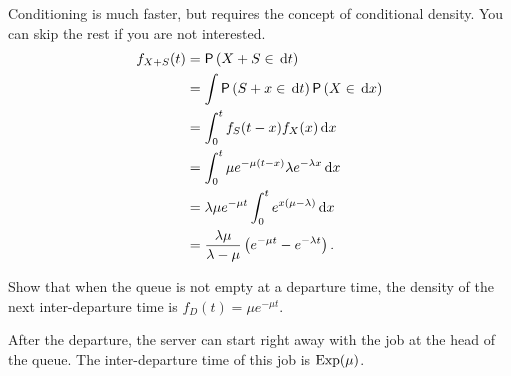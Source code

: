 \begin{extra}
\begin{solution}
Conditioning is much faster, but requires the concept of conditional density. You can skip the rest if you are not interested. 
    \begin{align*}
    f_{X+S}(t) 
&= \P{X+S\in \d{t}} \\
&= \int \P{S+x\in \d{t}}\P{X\in \d{x}} \\
&=\int_0^t f_S(t-x) f_X(x) \d{x} \\
     &= \int_0^t \mu e^{-\mu(t-x)} \lambda e^{-\lambda x} \d{x} \\
     &= \lambda \mu e^{-\mu t} \int_0^t  e^{x(\mu-\lambda)} \d{x} \\
&= \frac{\lambda \mu}{\lambda - \mu}\left(e^{-\mu t} - e^{-\lambda t}\right).
    \end{align*}
    \end{solution}
\end{extra}


\begin{extra}
Show  that when the queue is not empty at a departure time, the density of the next inter-departure time is $f_D(t) = \mu e^{-\mu t}$.
    \begin{solution}
After the departure, the server can start right away with the job at the head of the queue. The inter-departure time of this job is $\operatorname{Exp}(\mu)$.
    \end{solution}
\end{extra}

